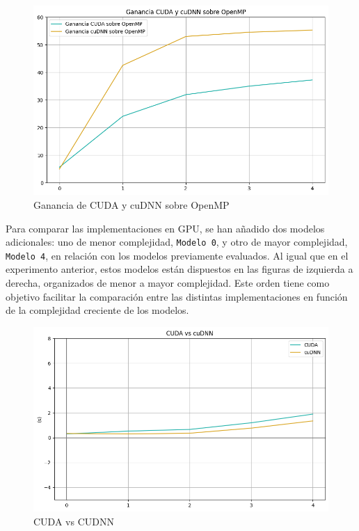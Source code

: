 \begin{figure}[H]
	\centering
	\includegraphics[scale=0.5]{imagenes/ganancia_cuda_cudnn_openmp.png}  
	\caption{Ganancia de CUDA y cuDNN sobre OpenMP}
	\label{fig:ganancia_cuda_cudnn_openmp}
\end{figure}

Para comparar las implementaciones en GPU, se han añadido dos modelos adicionales: uno de menor complejidad, \texttt{Modelo 0}, y otro de mayor complejidad, \texttt{Modelo 4}, en relación con los modelos previamente evaluados. Al igual que en el experimento anterior, estos modelos están dispuestos en las figuras de izquierda a derecha, organizados de menor a mayor complejidad. Este orden tiene como objetivo facilitar la comparación entre las distintas implementaciones en función de la complejidad creciente de los modelos.

\begin{figure}[H]
	\centering
	\includegraphics[scale=0.52]{imagenes/cuda_cudnn_1.png}  
	\caption{CUDA vs CUDNN}
	\label{fig:cuda_cudnn_1}
\end{figure}

